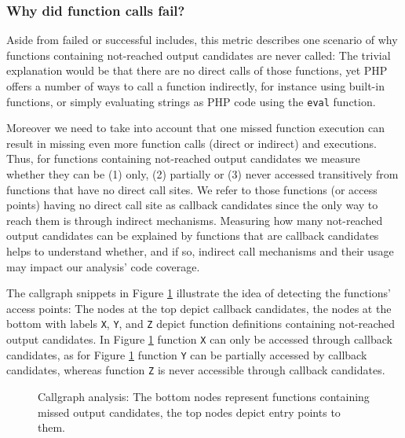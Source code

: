 \documentclass[sigconf]{acmart}
\renewcommand{\tt}[1]{\texttt{#1}}
\begin{document}
\subsubsection{Why did function calls fail?}
\label{WhyDidFunctionCallsFail}
Aside from failed or successful includes, this metric describes one scenario of
why functions containing not-reached output candidates are never called: The
trivial explanation would be that there are no direct calls of those functions,
yet PHP offers a number of ways to call a function indirectly, for instance
using built-in functions, or simply evaluating strings as PHP code using the
\texttt{eval} function.

Moreover we need to take into account that one missed function execution can
result in missing even more function calls (direct or indirect) and executions.
Thus, for functions containing not-reached output candidates we measure whether
they can be (1) only, (2) partially or (3) never accessed transitively from
functions that have no direct call sites. We refer to those functions (or
access points) having no direct call site as callback candidates since the only
way to reach them is through indirect mechanisms. Measuring how many
not-reached output candidates can be explained by functions that are callback
candidates helps to understand whether, and if so, indirect call mechanisms and
their usage may impact our analysis’ code coverage.

The callgraph snippets in Figure \ref{fig:callgraph} illustrate the idea of
detecting the functions’ access points: The nodes at the top depict callback
candidates, the nodes at the bottom with labels \tt{X}, \tt{Y}, and \tt{Z}
depict function definitions containing not-reached output candidates. In Figure
\ref{fig:callgraph} function \tt{X} can only be accessed through callback
candidates, as for Figure \ref{fig:callgraph} function \tt{Y} can be partially
accessed by callback candidates, whereas function \tt{Z} is never accessible
through callback candidates.

\begin{figure}
    
    \caption{Callgraph analysis: The bottom nodes represent functions
    containing missed output candidates, the top nodes depict entry points to
    them.}
    \label{fig:callgraph} 
\end{figure}

\end{document}

